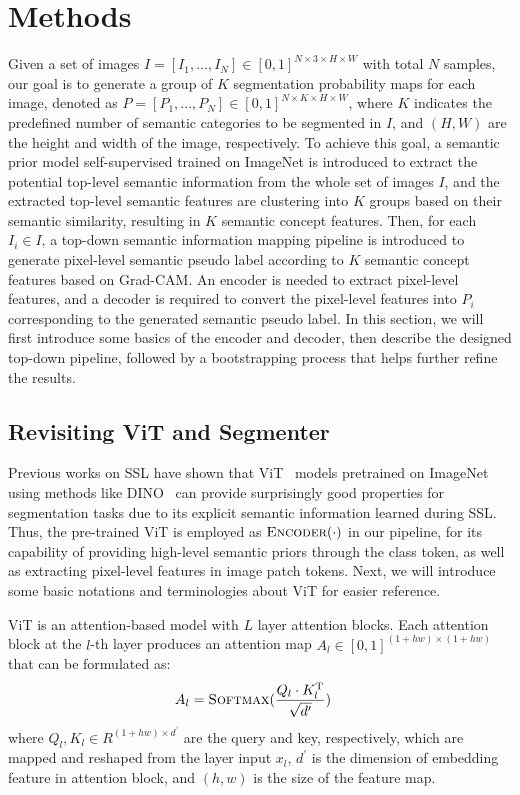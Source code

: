 \documentclass[runningheads]{llncs}
\begin{document}
\section{Methods}

Given a set of images $I = [I_1, ..., I_N] \in [0, 1] ^{N \times 3 \times H \times W}$ with total $N$ samples, 
our goal is to generate a group of $K$ segmentation probability maps for each image, denoted as $P = [P_1, ..., P_N] \in [0, 1]^{N \times K \times H \times W}$, where $K$ indicates the predefined number of semantic categories to be segmented in $I$, and $(H, W)$ are the height and width of the image, respectively. To achieve this goal, a semantic prior model self-supervised trained on ImageNet is introduced to extract the potential top-level semantic information from the whole set of images $I$, and the extracted top-level semantic features are clustering into $K$ groups based on their semantic similarity, resulting in $K$ semantic concept features. Then, for each $I_i \in I$, a top-down semantic information mapping pipeline is introduced to generate pixel-level semantic pseudo label according to $K$ semantic concept features based on Grad-CAM. An encoder is needed to extract pixel-level features, and a decoder is required to convert the pixel-level features into $P_i$ corresponding to the generated semantic pseudo label. In this section, we will first introduce some basics of the encoder and decoder, then describe the designed top-down pipeline, followed by a bootstrapping process that helps further refine the results.


\subsection{Revisiting ViT and Segmenter} 
Previous works on SSL have shown that ViT~\cite{dosovitskiy2020ViT}  models pretrained on ImageNet using methods like 
DINO~\cite{DINO} can provide surprisingly good properties for segmentation tasks due to its explicit semantic information learned during SSL. Thus, the pre-trained ViT is employed as $\Call{Encoder}{\cdot}$ in our pipeline, for its capability of providing high-level semantic priors through the class token, as well as extracting pixel-level features in image patch tokens. Next, we will introduce some basic notations and terminologies about ViT for easier reference.

ViT is an attention-based model with $L$ layer attention blocks. Each attention block at the $l$-th layer produces an attention map $A_l \in [0, 1]^{(1 + hw) \times (1 + hw)}$ that can be formulated as:
\begin{align}
    A_l &= \Call{Softmax}{\frac{Q_l \cdot K_l^ \mathrm{ T }}{\sqrt{d^\prime}}}
\end{align}
where $Q_l,K_l \in R^{(1 + hw) \times d^{\prime}}$ are the query and key, respectively, which are mapped and reshaped from the layer input $x_l$, $d^{\prime}$ is the dimension of embedding feature in attention block, and $(h, w)$ is the size of the feature map.
\end{document}
